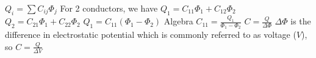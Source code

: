\documentclass[12pt]{article}
\begin{document}
\newline $Q_i = \sum C_{ij} \Phi_j$
\newline For 2 conductors, we have
\newline $Q_1 = C_11 \Phi_1 + C_12 \Phi_2$
\newline $Q_2 = C_21 \Phi_1 + C_22 \Phi_2$
\newline $Q_1 = C_11 (\Phi_1 - \Phi_2)$
\newline Algebra
\newline $C_11 = \frac{Q_1}{\Phi_1 - \Phi_2}$
\newline $C = \frac{Q}{\Delta \Phi}$
\newline $\Delta \Phi$ is the difference in electrostatic potential which is commonly referred to as voltage ($V$), so
\newline $C = \frac{Q}{\Delta V}$
\end{document}
